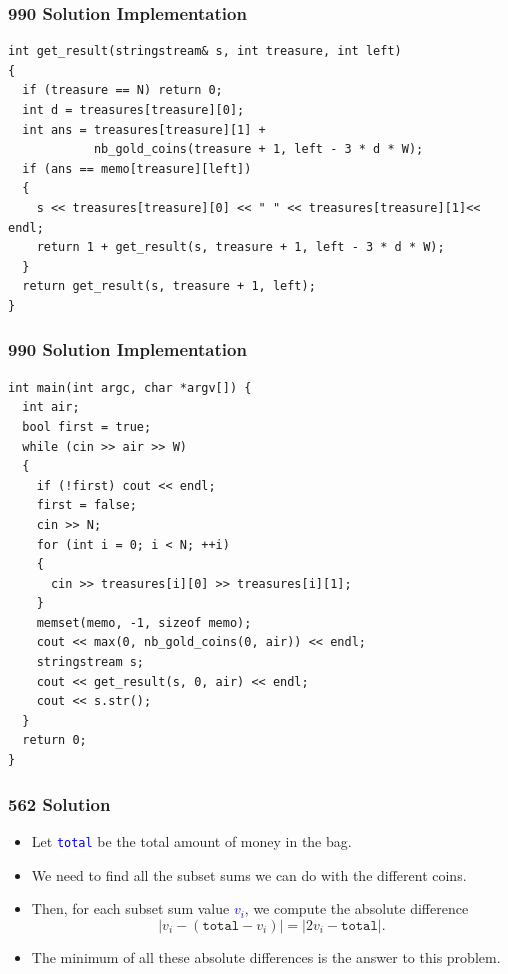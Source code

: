 \documentclass{beamer}
\begin{document}
\begin{frame}[containsverbatim]
\frametitle{990 Solution Implementation}
\scriptsize

\begin{lstlisting}
int get_result(stringstream& s, int treasure, int left)
{
  if (treasure == N) return 0;
  int d = treasures[treasure][0];
  int ans = treasures[treasure][1] +
            nb_gold_coins(treasure + 1, left - 3 * d * W);
  if (ans == memo[treasure][left])
  {
    s << treasures[treasure][0] << " " << treasures[treasure][1]<< endl;
    return 1 + get_result(s, treasure + 1, left - 3 * d * W);
  }
  return get_result(s, treasure + 1, left);
}
\end{lstlisting}

\end{frame}

\begin{frame}[containsverbatim]
\frametitle{990 Solution Implementation}
\scriptsize

\begin{lstlisting}
int main(int argc, char *argv[]) {
  int air;
  bool first = true;
  while (cin >> air >> W)
  {
    if (!first) cout << endl;
    first = false;
    cin >> N;
    for (int i = 0; i < N; ++i)
    {
      cin >> treasures[i][0] >> treasures[i][1];
    }
    memset(memo, -1, sizeof memo);
    cout << max(0, nb_gold_coins(0, air)) << endl;
    stringstream s;
    cout << get_result(s, 0, air) << endl;
    cout << s.str();
  }
  return 0;
}
\end{lstlisting}

\end{frame}

\begin{frame}%
\frametitle{562 Solution}

\begin{itemize}

\item Let \textcolor{blue}{\texttt{total}} be the total amount of money in the bag.

\item<2-> We need to find all the subset sums we can do with the different coins.

\item<3-> Then, for each subset sum value \textcolor{blue}{$v_i$}, we compute the absolute difference
$$
|v_i - (\texttt{total} - v_i)| = |2v_i - \texttt{total}|.
$$

\item<4-> The minimum of all these absolute differences is the answer to this problem.

\end{itemize}

\end{frame}
\end{document}
